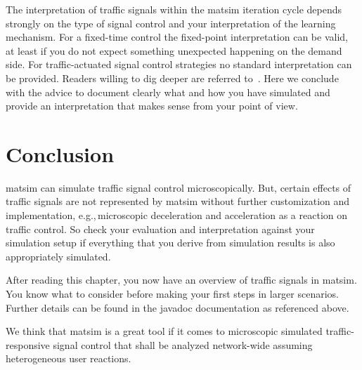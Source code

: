 The interpretation of traffic signals within the \gls{matsim} iteration cycle depends strongly on the type of signal control and your interpretation of the learning mechanism. 
For a fixed-time control the fixed-point interpretation can be valid, at least if you do not expect something unexpected happening on the demand side. 
For traffic-actuated signal control strategies no standard interpretation can be provided. 
Readers willing to dig deeper are referred to~\citet[][pp.~75]{Grether2014PhD}.  
Here we conclude with the advice to document clearly what and how you have simulated and provide an interpretation that makes sense from your point of view.    

\section{Conclusion} 
\label{sec:signals_evaluation_conclusion}
\gls{matsim} can simulate traffic signal control microscopically. 
But, certain effects of traffic signals are not represented by \gls{matsim} without further customization and implementation, e.g.,\,microscopic deceleration and acceleration as a reaction on traffic control. So check your evaluation and interpretation against your simulation setup if everything that you derive from simulation results is also appropriately simulated.  

After reading this chapter, you now have an overview of traffic signals in \gls{matsim}. You know what to consider before making your first steps in larger scenarios. Further details can be found in the \gls{javadoc} documentation as referenced above. 

We think that \gls{matsim} is a great tool if it comes to microscopic simulated traffic-responsive signal control that shall be analyzed network-wide assuming heterogeneous user reactions. 

 
